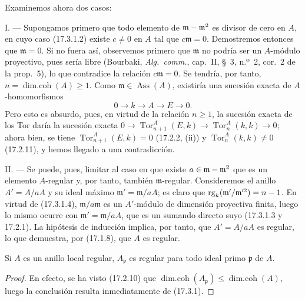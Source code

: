 Examinemos ahora dos casos:

\medskip\noindent I. --- Supongamos primero que todo elemento de
$\mathfrak{m}-\mathfrak{m}^2$ es divisor de cero en $A$, en cuyo caso
(17.3.1.2) existe $c\neq0$ en $A$ tal que $c\mathfrak{m}=0$. Demostremos
entonces que $\mathfrak{m}=0$. Si no fuera así, observemos primero que
$\mathfrak{m}$ no podría ser un $A$-módulo proyectivo, pues sería libre
(Bourbaki, \emph{Alg.~comm.}, cap.~II, \S~3, n.º~2, cor.~2 de la prop.~5),
lo que contradice la relación $c\mathfrak{m}=0$. Se tendría, por tanto,
$n=\operatorname{dim.coh}(A)\geq1$. Como
$\mathfrak{m}\in\operatorname{Ass}(A)$, existiría una sucesión exacta de
$A$-homomorfismos
\[
  0\longrightarrow k\longrightarrow A\longrightarrow E\longrightarrow0.
\]
Pero esto es absurdo, pues, en virtud de la relación $n\geq1$, la sucesión
exacta de los Tor daría la sucesión exacta
$0\longrightarrow\operatorname{Tor}^A_{n+1}(E,k)\longrightarrow
\operatorname{Tor}^A_n(k,k)\longrightarrow0$; ahora bien, se tiene
$\operatorname{Tor}^A_{n+1}(E,k)=0$ (17.2.2, (ii)) y
$\operatorname{Tor}^A_n(k,k)\neq0$ (17.2.11), y hemos llegado a una
contradicción.

\medskip\noindent II. --- Se puede, pues, limitar al caso en que
existe $a\in\mathfrak{m}-\mathfrak{m}^2$ que es un elemento $A$-regular y, por
tanto, también $\mathfrak{m}$-regular. Consideremos el anillo $A'=A/aA$ y su
ideal
máximo $\mathfrak{m}'=\mathfrak{m}/aA$; es claro que
$\operatorname{rg}_k(\mathfrak{m}'/\mathfrak{m}'^2)=n- 1$. En virtud de
(17.3.1.4), $\mathfrak{m}/a\mathfrak{m}$ es un $A'$-módulo de dimensión
proyectiva finita, luego lo mismo ocurre con
$\mathfrak{m}'=\mathfrak{m}/aA$, que es un sumando directo suyo (17.3.1.3 y
17.2.1). La hipótesis de inducción implica, por tanto, que $A'=A/aA$ es
regular, lo que demuestra, por (17.1.8), que $A$ es regular.

\begin{corollary}[17.3.2]
\label{0.17.3.2-fr}
Si $A$ es un anillo local regular, $A_{\mathfrak{p}}$ es regular para todo
ideal primo $\mathfrak{p}$ de $A$.
\end{corollary}

\begin{proof}
En efecto, se ha visto (17.2.10) que
$\operatorname{dim.coh}(A_{\mathfrak{p}})\leq
\operatorname{dim.coh}(A)$, luego la conclusión resulta inmediatamente de
(17.3.1).
\end{proof}


